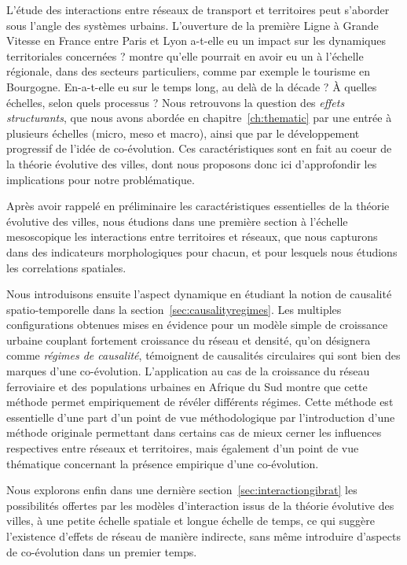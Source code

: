 L'étude des interactions entre réseaux de transport et territoires peut s'aborder sous l'angle des systèmes urbains. L'ouverture de la première Ligne à Grande Vitesse en France entre Paris et Lyon a-t-elle eu un impact sur les dynamiques territoriales concernées ? \cite{bonnafous1987regional} montre qu'elle pourrait en avoir eu un à l'échelle régionale, dans des secteurs particuliers, comme par exemple le tourisme en Bourgogne. En-a-t-elle eu sur le temps long, au delà de la décade ? À quelles échelles, selon quels processus ? Nous retrouvons la question des \emph{effets structurants}, que nous avons abordée en chapitre~\ref{ch:thematic} par une entrée à plusieurs échelles (micro, meso et macro), ainsi que par le développement progressif de l'idée de co-évolution. Ces caractéristiques sont en fait au coeur de la théorie évolutive des villes, dont nous proposons donc ici d'approfondir les implications pour notre problématique.



Après avoir rappelé en préliminaire les caractéristiques essentielles de la théorie évolutive des villes, nous étudions dans une première section à l'échelle mesoscopique les interactions entre territoires et réseaux, que nous capturons dans des indicateurs morphologiques pour chacun, et pour lesquels nous étudions les correlations spatiales.

Nous introduisons ensuite l'aspect dynamique en étudiant la notion de causalité spatio-temporelle dans la section~\ref{sec:causalityregimes}. Les multiples configurations obtenues mises en évidence pour un modèle simple de croissance urbaine couplant fortement croissance du réseau et densité, qu'on désignera comme \emph{régimes de causalité}, témoignent de causalités circulaires qui sont bien des marques d'une co-évolution. L'application au cas de la croissance du réseau ferroviaire et des populations urbaines en Afrique du Sud montre que cette méthode permet empiriquement de révéler différents régimes. Cette méthode est essentielle d'une part d'un point de vue méthodologique par l'introduction d'une méthode originale permettant dans certains cas de mieux cerner les influences respectives entre réseaux et territoires, mais également d'un point de vue thématique concernant la présence empirique d'une co-évolution.


Nous explorons enfin dans une dernière section~\ref{sec:interactiongibrat} les possibilités offertes par les modèles d'interaction issus de la théorie évolutive des villes, à une petite échelle spatiale et longue échelle de temps, ce qui suggère l'existence d'effets de réseau de manière indirecte, sans même introduire d'aspects de co-évolution dans un premier temps.


